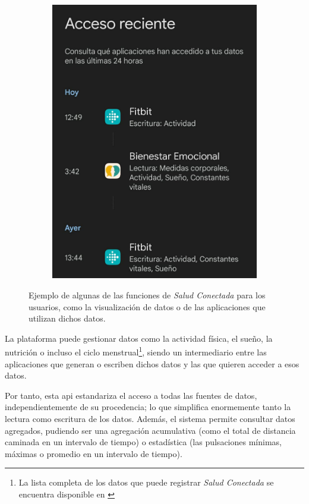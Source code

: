 \begin{figure}[h]
\begin{subfigure}[b]{0.49\textwidth}
                \includegraphics[width=1\linewidth]{figures/Health Connect acceso reciente.jpg}
            \end{subfigure}
            \caption{Ejemplo de algunas de las funciones de \textit{Salud Conectada} para los usuarios, como la visualización de datos o de las aplicaciones que utilizan dichos datos.}
            \label{figure:health_connect:ejemplo}
        \end{figure}
        
        La plataforma puede gestionar datos como la actividad física, el sueño, la nutrición o incluso el ciclo menstrual\footnote{La lista completa de los datos que puede registrar \textit{Salud Conectada} se encuentra 
        disponible en \cite{android_developers_lista_nodate}}, siendo un intermediario entre las aplicaciones que generan o escriben dichos datos y las que quieren acceder a esos datos. 
        
        Por tanto, esta \gls{api} estandariza el acceso a todas las fuentes de datos, independientemente de su procedencia; lo que simplifica enormemente tanto la lectura como escritura de los datos. Además, el sistema permite consultar
        datos agregados, pudiendo ser una agregación acumulativa (como el total de distancia caminada en un intervalo de tiempo) o estadística (las pulsaciones mínimas, máximas o promedio en un intervalo de tiempo).

